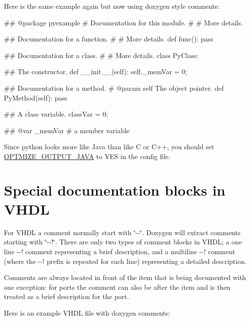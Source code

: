 Here is the same example again but now using doxygen style comments:


\begin{DoxyCodeInclude}
## @package pyexample
#  Documentation for this module.
#
#  More details.

## Documentation for a function.
#
#  More details.
def func():
    pass

## Documentation for a class.
#
#  More details.
class PyClass:
   
    ## The constructor.
    def __init__(self):
        self._memVar = 0;
   
    ## Documentation for a method.
    #  @param self The object pointer.
    def PyMethod(self):
        pass
     
    ## A class variable.
    classVar = 0;

    ## @var _memVar
    #  a member variable
\end{DoxyCodeInclude}
 

Since python looks more like Java than like C or C++, you should set \hyperlink{config_cfg_optimize_output_java}{OPTMIZE\_\-OUTPUT\_\-JAVA} to {\ttfamily YES} in the config file.

\hypertarget{docblocks_vhdlblocks}{}\section{Special documentation blocks in VHDL}\label{docblocks_vhdlblocks}
For VHDL a comment normally start with \char`\"{}-\/-\/\char`\"{}. Doxygen will extract comments starting with \char`\"{}-\/-\/!\char`\"{}. There are only two types of comment blocks in VHDL; a one line -\/-\/! comment representing a brief description, and a multiline -\/-\/! comment (where the -\/-\/! prefix is repeated for each line) representing a detailed description.

Comments are always located in front of the item that is being documented with one exception: for ports the comment can also be after the item and is then treated as a brief description for the port.

Here is an example VHDL file with doxygen comments:


